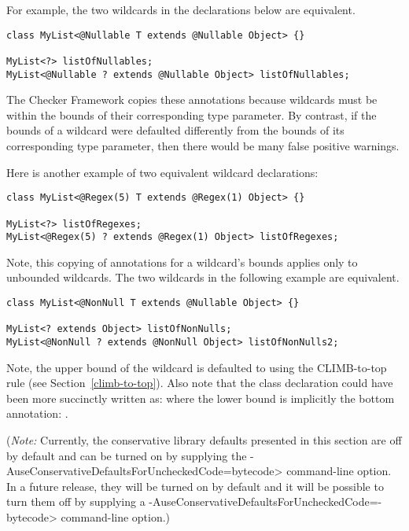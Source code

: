 For example, the two wildcards in
the declarations below are equivalent.

\begin{Verbatim}
class MyList<@Nullable T extends @Nullable Object> {}

MyList<?> listOfNullables;
MyList<@Nullable ? extends @Nullable Object> listOfNullables;
\end{Verbatim}

The Checker Framework copies
these annotations because wildcards must be within the bounds of their
corresponding type parameter.
By contrast, if the bounds of a wildcard
were defaulted differently from the bounds of its corresponding type
parameter, then there would be many false positive
 warnings.

Here is another example of two equivalent wildcard declarations:

\begin{Verbatim}
class MyList<@Regex(5) T extends @Regex(1) Object> {}

MyList<?> listOfRegexes;
MyList<@Regex(5) ? extends @Regex(1) Object> listOfRegexes;
\end{Verbatim}

Note, this copying of annotations for a wildcard's bounds applies only to
unbounded wildcards.  The two wildcards in the
following example are equivalent.

\begin{Verbatim}
class MyList<@NonNull T extends @Nullable Object> {}

MyList<? extends Object> listOfNonNulls;
MyList<@NonNull ? extends @NonNull Object> listOfNonNulls2;
\end{Verbatim}

Note, the upper bound of the wildcard  is defaulted to
 using the CLIMB-to-top rule (see Section~\ref{climb-to-top}).
Also note that the  class declaration could have been more succinctly
written as:  where the lower bound
is implicitly the bottom annotation: .


(\emph{Note:} Currently, the conservative library defaults presented in this section
are off by default and can be turned on by supplying the \<-AuseConservativeDefaultsForUncheckedCode=bytecode>
command-line option.  In a future release, they will be turned on
by default and it will be possible to turn them off by supplying a
\<-AuseConservativeDefaultsForUncheckedCode=-bytecode> command-line option.)

